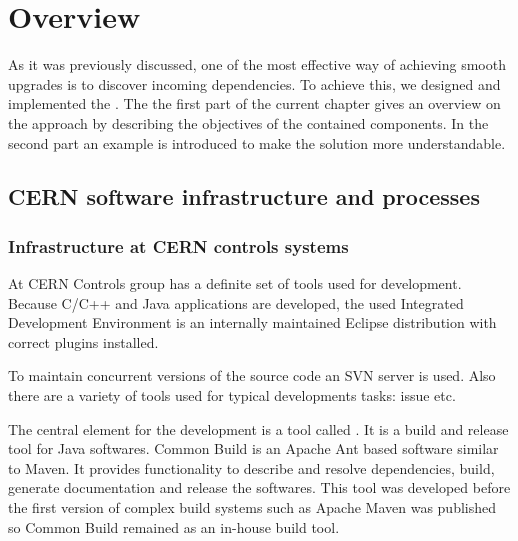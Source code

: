 \chapter{Overview}

As it was previously discussed, one of the most effective  way of achieving
smooth upgrades is to discover incoming dependencies. To achieve this, we
designed and implemented the \ptool{}. The the first part of the current chapter
gives an overview on the \ptool{} approach by describing the objectives of the
contained components. In the second part an example is introduced to make the
solution more understandable. 



\section{CERN software infrastructure and processes}

\subsection{Infrastructure at CERN controls systems}

At CERN Controls group has a definite set of tools used for development. Because
C/C++ and Java applications are developed, the used Integrated Development
Environment is an internally maintained Eclipse distribution with correct
plugins installed.

To maintain concurrent versions of the source code an SVN server is used. Also
there are a variety of tools used for typical developments tasks: issue
etc. 

The central element for the development is a tool called 
\cite{CommonBuild}. It is a build and release tool for Java softwares. Common
Build is an Apache Ant based software similar to Maven. It provides
functionality to describe and resolve dependencies, build, generate
documentation and release the softwares. This tool was developed before the
first version of complex build systems such as Apache Maven was published so 
Common Build remained as an in-house build tool. 

